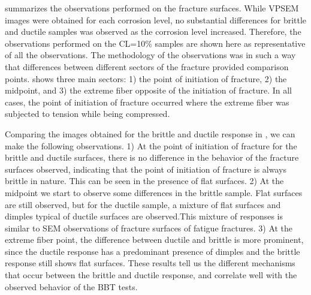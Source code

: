  summarizes the observations performed on the fracture surfaces. While VPSEM images were obtained for each corrosion level, no substantial differences for brittle and ductile samples was observed as the corrosion level increased. Therefore, the observations performed on the CL=10\% samples are shown here as representative of all the observations. The methodology of the observations was in such a way that differences between different sectors of the fracture provided comparison points.   shows three main sectors: 1) the point of initiation of fracture, 2) the midpoint, and 3) the extreme fiber opposite of the initiation of fracture. In all cases, the point of initiation of fracture occurred where the extreme fiber was subjected to tension while being compressed.

Comparing the images obtained for the brittle and ductile response in , we can make the following observations. 1) At the point of initiation of fracture for the brittle and ductile surfaces, there is no difference in the behavior of the fracture surfaces observed, indicating that the point of initiation of fracture is always brittle in nature. This can be seen in the presence of flat surfaces. 2) At the midpoint we start to observe some differences in the brittle sample. Flat surfaces are still observed, but for the ductile sample, a mixture of flat surfaces and dimples typical of ductile surfaces are observed.This mixture of responses is similar to SEM observations of fracture surfaces of fatigue fractures. 3) At the extreme fiber point, the difference between ductile and brittle is more prominent, since the ductile response has a predominant presence of dimples and the brittle response still shows flat surfaces. These results tell us the different mechanisms that occur between the brittle and ductile response, and correlate well with the observed behavior of the BBT tests.

